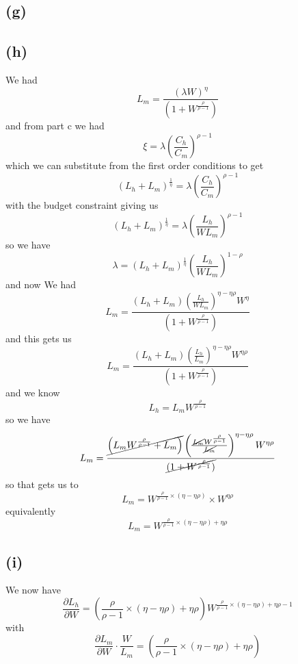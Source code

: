 \documentclass[11pt]{amsart}
\begin{document}
\subsection*{(g)}


\subsection*{(h)}

We had
\[
L_m = \frac{(\lambda W)^{\eta}}{(1 + W^{\frac{\rho}{\rho-1}})}
\]
and from part c we had
\[
\xi = \lambda \left( \frac{C_h}{C_m} \right)^{\rho-1}
\]
which we can substitute from the first order conditions to get
\[
\left(  L_h + L_m \right)^{\frac{1}{\eta} } = \lambda \left( \frac{C_h}{C_m} \right)^{\rho-1}
\]
with the budget constraint giving us
\[
\left(  L_h + L_m \right)^{\frac{1}{\eta} } = \lambda \left( \frac{L_h}{WL_m} \right)^{\rho-1}
\]
so we have
\[
\lambda = \left(  L_h + L_m \right)^{\frac{1}{\eta} } \left( \frac{L_h}{WL_m} \right)^{1-\rho}
\]
and now
We had
\[
L_m = \frac{\left(  L_h + L_m \right) \left( \frac{L_h}{WL_m} \right)^{\eta - \eta \rho} W^{\eta}}{(1 + W^{\frac{\rho}{\rho-1}})}
\]
and this gets us
\[
L_m = \frac{\left(  L_h + L_m \right) \left( \frac{L_h}{L_m} \right)^{\eta - \eta \rho} W^{\eta \rho}}{(1 + W^{\frac{\rho}{\rho-1}})}
\]
and we know
\[
L_h = L_m W^{\frac{\rho}{\rho-1}}
\]
so we have
\[
L_m = \frac{\cancel{\left(   L_m W^{\frac{\rho}{\rho-1}} + L_m \right)} \left( \frac{ \cancel{L_m} W^{\frac{\rho}{\rho-1}}}{\cancel{L_m}} \right)^{\eta - \eta \rho} W^{\eta \rho}}{\cancel{(1 + W^{\frac{\rho}{\rho-1}})}}
\]
so that gets us to
\[
L_m = W^{\frac{\rho}{\rho-1} \times (\eta - \eta \rho)} \times W^{\eta \rho}
\]
equivalently 
\[
L_m = W^{\frac{\rho}{\rho-1} \times (\eta - \eta \rho) + \eta \rho} 
\]

\subsection*{(i)}

We now have
\[
\frac{\partial L_h}{\partial W} = \left(\frac{\rho}{\rho-1} \times (\eta - \eta \rho) + \eta \rho \right) W^{\frac{\rho}{\rho-1} \times (\eta - \eta \rho) + \eta \rho - 1 } 
\]
with 
\[
\frac{\partial L_m}{\partial W} \cdot \frac{W}{L_m} = \left(\frac{\rho}{\rho-1} \times (\eta - \eta \rho) + \eta \rho \right)
\]
\end{document}
